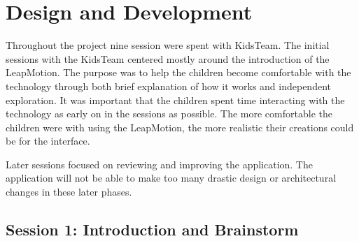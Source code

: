 
\chapter{Design and Development} %

\label{Chapter3} %






Throughout the project nine session were spent with KidsTeam. The initial sessions with the KidsTeam centered mostly around the introduction of the LeapMotion. The purpose was to help the children become comfortable with the technology through both brief explanation of how it works and independent exploration. It was important that the children spent time interacting with the technology as early on in the sessions as possible. The more comfortable the children were with using the LeapMotion, the more realistic their creations could be for the interface. 

Later sessions focused on reviewing and improving the application. The application will not be able to make too many drastic design or architectural changes in these later phases.
\section{Session 1: Introduction and Brainstorm}\label{session1}

